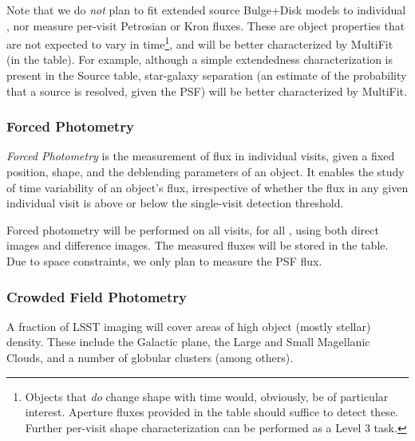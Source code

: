 \documentclass[SE,lsstdraft,toc]{lsstdoc}
\newcommand{\marginreq}[1]{\marginpar{\hspace{0pt}\tiny #1}}
\newcommand{\dmreq}[1]{\marginreq{DMS-REQ-#1}}
\begin{document}
\begin{itemize}
\end{itemize}

Note that we do \emph{not} plan to fit extended source Bulge+Disk models to individual \Sources, nor measure per-visit Petrosian or Kron fluxes. These are object properties that are not expected to vary in time\footnote{Objects that \emph{do} change shape with time would, obviously, be of particular interest. Aperture fluxes provided in the \Source table should suffice to detect these. Further per-visit shape characterization can be performed as a Level 3 task.}, and will be better characterized by MultiFit (in the \Object table).
For example, although a simple extendedness characterization is present in the Source table, star-galaxy separation (an estimate of the probability that a source is resolved, given the PSF) will be better characterized by MultiFit.


\subsubsection{Forced Photometry}
\label{sec:forcedPhotL2}
\dmreq{0268}\dmreq{0287}

\emph{Forced Photometry} is the measurement of flux in individual visits, given a fixed position, shape, and the deblending parameters of an object. It enables the study of time variability of an object's flux, irrespective of whether the flux in any given individual visit is above or below the single-visit detection threshold.

Forced photometry will be performed on all visits, for all \Objects, using both direct images and difference images.
The measured fluxes will be stored in the \ForcedSources table. Due to space constraints, we only plan to measure the PSF flux.

\subsubsection{Crowded Field Photometry}

A fraction of LSST imaging will cover areas of high object (mostly stellar) density. These include the Galactic plane, the Large and Small Magellanic Clouds, and a number of globular clusters (among others).

\end{document}
